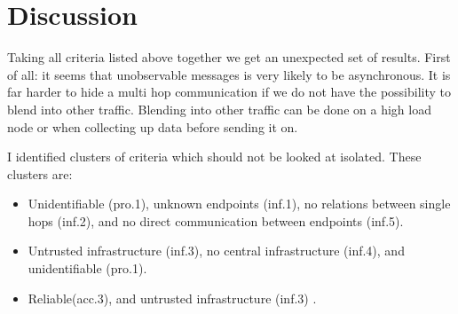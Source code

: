 \documentclass[12pt,journal,compsoc,peerreview]{IEEEtran}
\begin{document}
\section{Discussion}
Taking all criteria listed above together we get an unexpected set of results. First of all: it seems that unobservable messages is very likely to be asynchronous. It is far harder to hide a multi hop communication if we do not have the possibility to blend into other traffic. Blending into other traffic can be done on a high load node or when collecting up data before sending it on.

I identified clusters of criteria which should not be looked at isolated. These clusters are:

\begin{itemize}
	\item Unidentifiable (pro.1), unknown endpoints (inf.1), no relations between single hops (inf.2), and no direct communication between endpoints (inf.5).
	\item Untrusted infrastructure (inf.3), no central infrastructure (inf.4), and unidentifiable (pro.1).
	\item Reliable(acc.3), and untrusted infrastructure (inf.3) .
\end{itemize}
\end{document}
